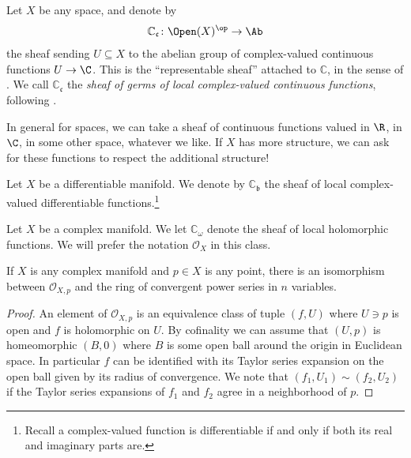 \documentclass[11pt]{amsart}
\begin{document}
\begin{example} Let $X$ be any space, and denote by
\begin{align*}
    \mathbb{C}_{\mathfrak{c}} \colon \Open(X)^\op \to \Ab
\end{align*}
the sheaf sending $U \subseteq X$ to the abelian group of complex-valued continuous functions $U \to \C$. This is the ``representable sheaf'' attached to $\mathbb{C}$, in the sense of . We call $\mathbb{C}_{\mathfrak{c}}$ the \emph{sheaf of germs of local complex-valued continuous functions}, following \cite[p.~23]{Hirzebruch}.
\end{example}

In general for spaces, we can take a sheaf of continuous functions valued in $\R$, in $\C$, in some other space, whatever we like. If $X$ has more structure, we can ask for these functions to respect the additional structure!

\begin{example} Let $X$ be a differentiable manifold. We denote by $\mathbb{C}_{\mathfrak{b}}$ the sheaf of local complex-valued differentiable functions.\footnote{Recall a complex-valued function is differentiable if and only if both its real and imaginary parts are.}
\end{example}

\begin{example} Let $X$ be a complex manifold. We let $\mathbb{C}_{\omega}$ denote the sheaf of local holomorphic functions. We will prefer the notation $\mathcal{O}_X$ in this class.
\end{example}

\begin{proposition}\label{prop:stalk-of-OX} 
If $X$ is any complex manifold and $p\in X$ is any point, there is an isomorphism between $\mathcal{O}_{X,p}$ and the ring of convergent power series in $n$ variables.
\end{proposition}
\begin{proof} An element of $\mathcal{O}_{X,p}$ is an equivalence class of tuple $(f,U)$ where $U \ni p$ is open and $f$ is holomorphic on $U$. By cofinality we can assume that $(U,p)$ is homeomorphic $(B,0)$ where $B$ is some open ball around the origin in Euclidean space. In particular $f$ can be identified with its Taylor series expansion on the open ball given by its radius of convergence. We note that $(f_1,U_1) \sim (f_2,U_2)$ if the Taylor series expansions of $f_1$ and $f_2$ agree in a neighborhood of $p$.
\end{proof}
\end{document}

